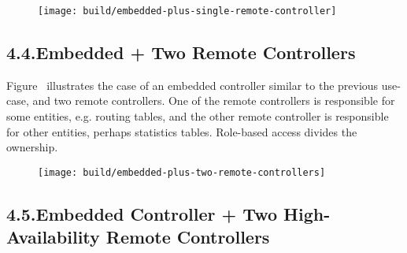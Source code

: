 \documentclass[11pt]{article}
\begin{document}
{\begin{figure}[tbp]
\begin{mdcenter}
\noindent{}\texttt{[image: build/embedded-plus-single-remote-controller]}{}%

\mdhr{}%

\noindent{}%
\end{mdcenter}\label{fig-embedded-plus-single-remote-controller}%
\end{figure}%

\subsection{4.4.\hspace*{0.5em}Embedded + Two Remote Controllers}\label{sec-embedded-two-remote-controllers}%

\noindent{}Figure~ illustrates the case of an
embedded controller similar to the previous use-case, and two remote
controllers. One of the remote controllers is responsible for some entities,
e.g. routing tables, and the other remote controller is responsible for other
entities, perhaps statistics tables. Role-based access divides the ownership.%

\begin{figure}[tbp]%
\begin{mdcenter}%

\noindent{}\texttt{[image: build/embedded-plus-two-remote-controllers]}{}%

\mdhr{}%

\noindent{}%
\end{mdcenter}\label{fig-embedded-plus-two-remote-controllers}%
\end{figure}%

\subsection{4.5.\hspace*{0.5em}Embedded Controller + Two High-Availability Remote Controllers}\label{sec-embedded-controller-two-high-availability-remote-controllers}%

}
\end{document}
